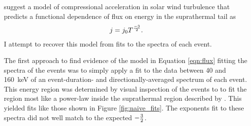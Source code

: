 \documentclass[letterpaper,11pt]{article}
\begin{document}
%

\citet{Fisk2006} suggest a model of compressional acceleration in solar wind turbulence that predicts a functional dependence of flux on energy in the suprathermal tail as
\begin{equation}
j = j_0 T^{-3 \over 2}.
\label{eqn:flux}
\end{equation}
I attempt to recover this model from fits to the spectra of each event.

The first approach to find evidence of the model in Equation \ref{eqn:flux} fitting the spectra of the events was to simply apply a fit to the data between 40 and \SI{160}{\kilo\electronvolt} of an event-duration- and directionally-averaged spectrum of each event.  This energy region was determined by visual inspection of the events to to fit the region most like a power-law inside the suprathermal region described by \citet{Fisk2008}. This yielded fits like those shown in Figure \ref{fig:naive_fits}.  The exponents fit to these spectra did not well match to the expected $-{3 \over 2}$.
\end{document}
